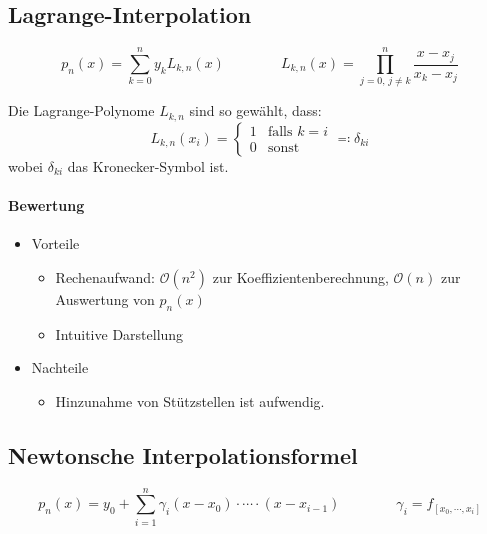 \documentclass[a4paper, 11pt, accentcolor = tud3b]{tudreport}
\begin{document}
	        \subsection{Lagrange-Interpolation}
	            \begin{equation*}
		            p_n(x) = \sum_{k = 0}^n y_k L_{k,n}(x) \qquad\qquad L_{k,n}(x) = \prod_{j = 0,\, j \neq k}^n \frac{x - x_j}{x_k - x_j}
	            \end{equation*}
	            
	            Die Lagrange-Polynome \( L_{k,n} \) sind so gewählt, dass:
	            \begin{equation*}
		            L_{k,n}(x_i) =
			            \begin{cases}
				            1 & \text{falls } k = i \\
				            0 & \text{sonst}
			            \end{cases}
			       \eqqcolon \delta_{ki}
	            \end{equation*}
	            wobei \( \delta_{ki} \) das Kronecker-Symbol ist.
	            
	            \paragraph{Bewertung}
		            \begin{itemize}
		            	\item Vorteile
			            	\begin{itemize}
			            		\item Rechenaufwand: \( \mathcal{O}(n^2) \) zur Koeffizientenberechnung, \( \mathcal{O}(n) \) zur Auswertung von \( p_n(x) \)
			            		\item Intuitive Darstellung
			            	\end{itemize}
		            	\item Nachteile
			            	\begin{itemize}
			            		\item Hinzunahme von Stützstellen ist aufwendig.
			            	\end{itemize}
		            \end{itemize}
	
	        \subsection{Newtonsche Interpolationsformel}
	            \begin{equation*}
		            p_n(x) = y_0 + \sum_{i=1}^n \gamma_i (x - x_0) \cdot \cdots \cdot (x - x_{i-1}) \qquad\qquad \gamma_i = f_{[x_0, \cdots, x_i]}
	            \end{equation*}
	            
\end{document}
